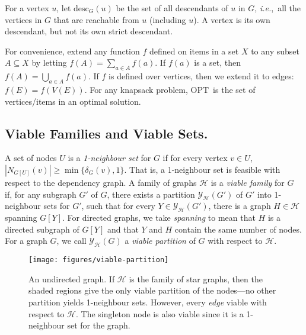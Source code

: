 \documentclass[12pt]{article}
\newcommand{\desc}{\ensuremath{\mathrm{desc}}}
\newcommand{\OPT}{\ensuremath{\mathrm{OPT}\xspace}}
\begin{document}
For a vertex $u$,
let $\desc_G(u)$ be the set of all descendants of $u$ in $G$, {\em i.e.},~all
the vertices in $G$ that are reachable from $u$ (including $u$).  A
vertex is its own descendant, but not its own
strict descendant.





For convenience, extend any function $f$ defined on items in a set $X$
to any subset $A \subseteq X$ by letting $f(A) = \sum_{a \in A} f(a)$.
If $f(a)$ is a set, then $f(A) = \bigcup_{a\in A} f(a)$.  If $f$ is
defined over vertices, then we extend it to edges: $f(E) =
f(V(E))$.  For any knapsack problem, \OPT~is the set of
vertices/items in an optimal solution.

\subsection{Viable Families and Viable Sets.}



A set of nodes $U$ is a {\em 1-neighbour set} for $G$ if for every vertex $v \in U$, $|N_{G[U]}(v)| \geq \min\{\delta_{G}(v),1\}$.  That is, a 1-neighbour set is feasible with respect to the dependency graph.  A family of graphs $\mathcal{H}$ is a {\em viable family} for $G$ if, for any subgraph $G'$ of $G$, there exists a partition $\mathcal{Y}_{\mathcal{H}}(G')$ of $G'$ into 1-neighbour sets for $G'$, such that for every $Y \in \mathcal{Y}_{\mathcal{H}}(G')$, there is a graph $H \in \mathcal{H}$ spanning $G[Y]$.  For directed graphs, we take {\em spanning} to mean that $H$ is a directed subgraph of $G[Y]$ and that $Y$ and $H$ contain the same number of nodes.  For a graph $G$,  we call $\mathcal{Y}_{\mathcal{H}}(G)$ a {\em viable partition} of $G$ with respect to $\mathcal{H}$.

\begin{figure}[bt]
\centering\texttt{[image: figures/viable-partition]}
\caption{ \label{fig:viable-partition}  An undirected graph.   If $\mathcal{H}$ is the family of star graphs, then the shaded regions give the only viable partition of the nodes---no other partition yields 1-neighbour sets.  However, every {\em edge} viable with respect to $\mathcal{H}$.  The singleton node is also viable since it is a 1-neighbour set for the graph.}
\end{figure}
\end{document}
